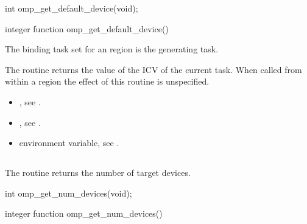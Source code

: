 \format
\ccppspecificstart
\begin{boxedcode}
int omp\_get\_default\_device(void);
\end{boxedcode}
\ccppspecificend

\fortranspecificstart
\begin{boxedcode}
integer function omp\_get\_default\_device()
\end{boxedcode}
\fortranspecificend

\binding
The binding task set for an  region is the generating 
task. 

\effect
The  routine returns the value of the  
ICV of the current task. When called from within a  region the effect of this 
routine is unspecified.

\crossreferences
\begin{itemize}
\item {}, see 
.

\item {}, see 
.

\item {} environment variable, see 
. 
\end{itemize}











\subsection{}
\label{subsec:omp_get_num_devices}
\summary
The  routine returns the number of target devices.

\format
\ccppspecificstart
\begin{boxedcode}
int omp\_get\_num\_devices(void);
\end{boxedcode}
\ccppspecificend

\fortranspecificstart
\begin{boxedcode}
integer function omp\_get\_num\_devices()
\end{boxedcode}
\fortranspecificend

